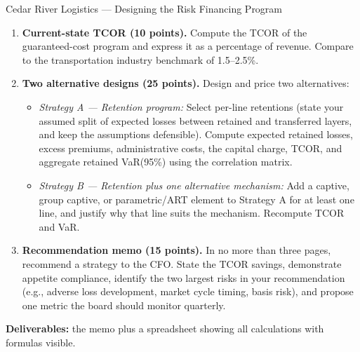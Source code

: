 \documentclass[11pt,openany]{book}
\providecommand{\tightlist}{\setlength{\itemsep}{0pt}\setlength{\parskip}{0pt}}
\begin{document}
\begin{minicase}{Cedar River Logistics --- Designing the Risk Financing
Program}
\begin{enumerate}
\item \textbf{Current-state TCOR (10 points).} Compute the TCOR of the
  guaranteed-cost program and express it as a percentage of revenue. Compare
  to the transportation industry benchmark of 1.5--2.5\%.
\item \textbf{Two alternative designs (25 points).} Design and price two
  alternatives:
  \begin{itemize}\tightlist
    \item \emph{Strategy A --- Retention program:} Select per-line retentions
      (state your assumed split of expected losses between retained and
      transferred layers, and keep the assumptions defensible). Compute
      expected retained losses, excess premiums, administrative costs, the
      capital charge, TCOR, and aggregate retained VaR(95\%) using the
      correlation matrix.
    \item \emph{Strategy B --- Retention plus one alternative mechanism:} Add
      a captive, group captive, or parametric/ART element to Strategy A for
      at least one line, and justify why that line suits the mechanism.
      Recompute TCOR and VaR.
  \end{itemize}
\item \textbf{Recommendation memo (15 points).} In no more than three pages,
  recommend a strategy to the CFO. State the TCOR savings, demonstrate
  appetite compliance, identify the two largest risks in your recommendation
  (e.g., adverse loss development, market cycle timing, basis risk), and
  propose one metric the board should monitor quarterly.
\end{enumerate}

\textbf{Deliverables:} the memo plus a spreadsheet showing all calculations
with formulas visible.
\end{minicase}

\end{document}
